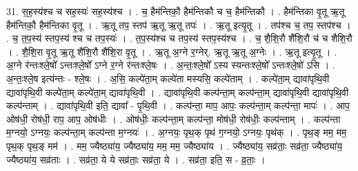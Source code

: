 \documentclass[17pt]{extarticle}
\begin{document}
31. स॒ह॒स्य॑श्च च सह॒स्यः॑ सह॒स्य॑श्च । . च॒ हैम॑न्तिकौ॒ हैम॑न्तिकौ च च॒ हैम॑न्तिकौ । . हैम॑न्तिका वृ॒तू ऋ॒तू हैम॑न्तिकौ॒ हैम॑न्तिका वृ॒तू । . ऋ॒तू तप॒ स्तप॑ ऋ॒तू ऋ॒तू तपः॑ । . ऋ॒तू इत्यृ॒तू । . तप॑श्च च॒ तप॒ स्तप॑श्च । . च॒ त॒प॒स्य॑ स्तप॒स्य॑ श्च च तप॒स्यः॑ । . त॒प॒स्य॑श्च च तप॒स्य॑ स्तप॒स्य॑श्च । . च॒ शै॒शि॒रौ शै॑शि॒रौ च॑ च शैशि॒रौ । . शै॒शि॒रा वृ॒तू ऋ॒तू शै॑शि॒रौ शै॑शि॒रा वृ॒तू । . ऋ॒तू अ॒ग्ने र॒ग्नेर्. ऋ॒तू ऋ॒तू अ॒ग्नेः । . ऋ॒तू इत्यृ॒तू । . अ॒ग्ने र॑न्तःश्ले॒षो᳚ ऽन्तःश्ले॒षो᳚ ऽग्ने र॒ग्ने र॑न्तःश्ले॒षः । . अ॒न्तः॒श्ले॒षो᳚ ऽस्य स्यन्तःश्ले॒षो᳚ ऽन्तःश्ले॒षो॑ ऽसि । . अ॒न्तः॒श्ले॒ष इत्य॑न्तः - श्ले॒षः । . अ॒सि॒ कल्पे॑ता॒म् कल्पे॑ता मस्यसि॒ कल्पे॑ताम् । . कल्पे॑ता॒म् द्यावा॑पृथि॒वी द्यावा॑पृथि॒वी कल्पे॑ता॒म् कल्पे॑ता॒म् द्यावा॑पृथि॒वी । . द्यावा॑पृथि॒वी कल्प॑न्ता॒म् कल्प॑न्ता॒म् द्यावा॑पृथि॒वी द्यावा॑पृथि॒वी कल्प॑न्ताम् । . द्यावा॑पृथि॒वी इति॒ द्यावा᳚ - पृ॒थि॒वी । . कल्प॑न्ता॒ माप॒ आपः॒ कल्प॑न्ता॒म् कल्प॑न्ता॒ मापः॑ । . आप॒ ओष॑धी॒ रोष॑धी॒ राप॒ आप॒ ओष॑धीः । . ओष॑धीः॒ कल्प॑न्ता॒म् कल्प॑न्ता॒ मोष॑धी॒ रोष॑धीः॒ कल्प॑न्ताम् । . कल्प॑न्ता म॒ग्नयो॒ ऽग्नयः॒ कल्प॑न्ता॒म् कल्प॑न्ता म॒ग्नयः॑ । . अ॒ग्नयः॒ पृथ॒क् पृथ॑ ग॒ग्नयो॒ ऽग्नयः॒ पृथ॑क् । . पृथ॒ङ् मम॒ मम॒ पृथ॒क् पृथ॒ङ् मम॑ । . मम॒ ज्यैष्ठ्या॑य॒ ज्यैष्ठ्या॑य॒ मम॒ मम॒ ज्यैष्ठ्या॑य । . ज्यैष्ठ्या॑य॒ सव्र॑ताः॒ सव्र॑ता॒ ज्यैष्ठ्या॑य॒ ज्यैष्ठ्या॑य॒ सव्र॑ताः । . सव्र॑ता॒ ये ये सव्र॑ताः॒ सव्र॑ता॒ ये । . सव्र॑ता॒ इति॒ स - व्र॒ताः॒ । \newline
\end{document}
